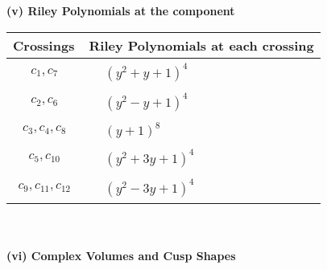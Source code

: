 \documentclass[1p]{elsarticle_modified}
\theoremstyle{definition}
\begin{document}
\newpage\renewcommand{\arraystretch}{1}
\flushleft \textbf{(v) Riley Polynomials at the component}\newline \\
\begin{tabular}{m{50pt}|m{274pt}}
Crossings & \hspace{64pt}Riley Polynomials at each crossing \\
\hline $$\begin{aligned}c_{1},c_{7}\end{aligned}$$&$\begin{aligned}
&(y^2+y+1)^4
\end{aligned}$\\
\hline $$\begin{aligned}c_{2},c_{6}\end{aligned}$$&$\begin{aligned}
&(y^2- y+1)^4
\end{aligned}$\\
\hline $$\begin{aligned}c_{3},c_{4},c_{8}\end{aligned}$$&$\begin{aligned}
&(y+1)^8
\end{aligned}$\\
\hline $$\begin{aligned}c_{5},c_{10}\end{aligned}$$&$\begin{aligned}
&(y^2+3 y+1)^4
\end{aligned}$\\
\hline $$\begin{aligned}c_{9},c_{11},c_{12}\end{aligned}$$&$\begin{aligned}
&(y^2-3 y+1)^4
\end{aligned}$\\
\hline
\end{tabular}\\~\\
\newpage\flushleft \textbf{(vi) Complex Volumes and Cusp Shapes}
\end{document}
